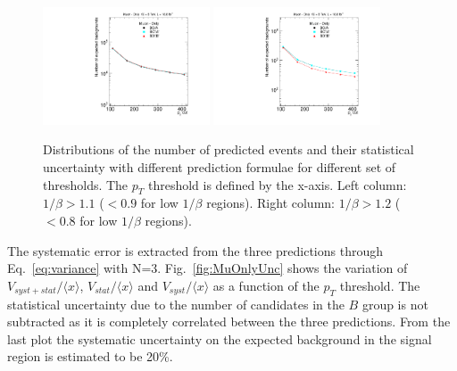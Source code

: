 \begin{figure}
\begin{center}
\includegraphics[clip=true, trim=0.0cm 0cm 3.0cm 0cm,width=0.44\textwidth]{figures/muonly/Data8TeVCollisionPrediction_TOF110}
\includegraphics[clip=true, trim=0.0cm 0cm 3.0cm 0cm,width=0.44\textwidth]{figures/muonly/Data8TeVCollisionPrediction_TOF120}
\caption[Distributions of the number of predicted events with different prediction formulae for different sets of thresholds in the \muononly\ analysis.]
{Distributions of the number of predicted events and their statistical uncertainty with different prediction formulae for different set of thresholds.
The $p_{T}$ threshold is defined by the x-axis.
Left column: $1/\beta>1.1$ ($<0.9$ for low $1/\beta$ regions). Right column: $1/\beta>1.2$ ($<0.8$ for low $1/\beta$ regions).}
\label{fig:MuOnlycorrelation}
\end{center}
\end{figure}

The systematic error is extracted from the three predictions
through Eq.~\ref{eq:variance} with N=3.
Fig.~\ref{fig:MuOnlyUnc} shows the variation of
$V_{syst+stat}/\langle x \rangle $, $V_{stat}/ \langle x \rangle $ and $V_{syst}/ \langle x \rangle $
as a function of the $p_T$ threshold. The statistical uncertainty due to the number of candidates in the $B$ group is not subtracted as it is completely correlated
between the three predictions. From the last plot
the systematic uncertainty on the expected background in the signal
region is estimated to be 20\%.

